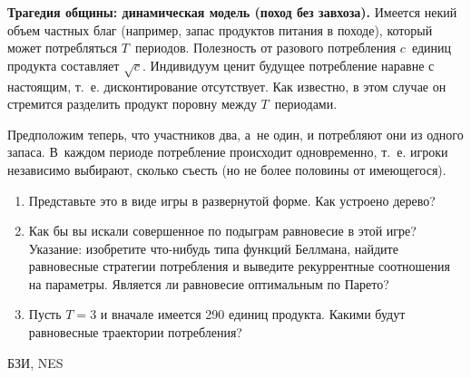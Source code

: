 \begin{problem}
 {\bf Трагедия общины: динамическая модель (поход без
завхоза).} Имеется некий объем частных благ (например,
запас продуктов питания в походе), который может
потребляться $T$~периодов. Полезность от разового
потребления $c$~единиц продукта составляет $\sqrt{c}$.
Индивидуум ценит будущее потребление наравне с настоящим,
т.~е. дисконтирование отсутствует. Как известно, в этом
случае он стремится разделить продукт поровну между
$T$~периодами.

Предположим теперь, что участников два, а~не один, и
потребляют они из одного запаса. В~каждом периоде
потребление происходит одновременно, т.~е. игроки
независимо выбирают, сколько съесть (но не более половины
от имеющегося).

\begin{enumerate}

\item Представьте это в виде игры в развернутой форме. Как
устроено дерево?

\item Как бы вы искали совершенное по подыграм равновесие в
этой игре? Указание: изобретите что-нибудь типа функций
Беллмана, найдите равновесные стратегии потребления и
выведите рекуррентные соотношения на параметры. Является ли
равновесие оптимальным по Парето?

\item Пусть $T=3$ и вначале имеется 290 единиц продукта.
Какими будут равновесные траектории потребления?

\end{enumerate}




\begin{source}
БЗИ, NES
\end{source}


\begin{sol}

\end{sol}
\end{problem}





